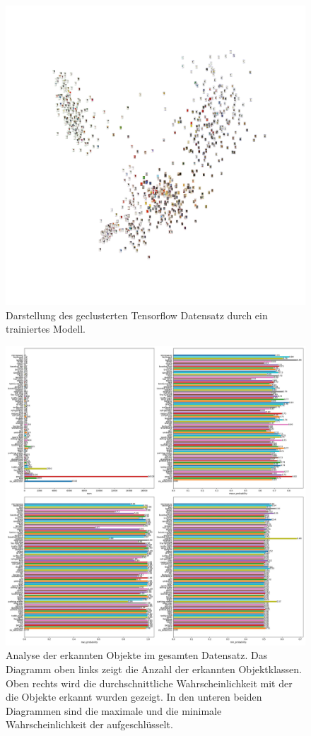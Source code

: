 \documentclass[a4paper,12pt,ngerman]{article}
\begin{document}
\newpage
\begin{figure}[ht]
\includegraphics[width=\linewidth]{image_cluster_trained}
\centering
\caption{Darstellung des geclusterten Tensorflow Datensatz durch ein trainiertes Modell.}
\end{figure}

\newpage
\begin{figure}[ht]
\includegraphics[width=\linewidth]{Analyse_des_gesamten_Datensatzes}
\centering
\caption{Analyse der erkannten Objekte im gesamten Datensatz. Das Diagramm oben links zeigt die Anzahl der erkannten Objektklassen. Oben rechts wird die durchschnittliche Wahrscheinlichkeit mit der die Objekte erkannt wurden gezeigt. In den unteren beiden Diagrammen sind die maximale und die minimale Wahrscheinlichkeit der aufgeschlüsselt.}
\end{figure}
\end{document}
